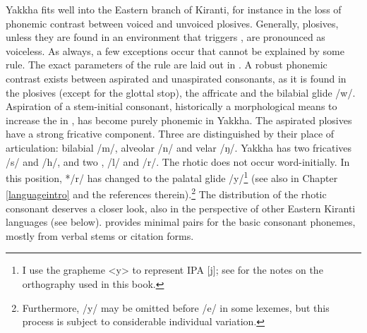 Yakkha fits well into the Eastern branch of Kiranti, for instance in the loss of phonemic  contrast between voiced and unvoiced plosives. Generally, plosives, unless they are found in an environment that triggers , are pronounced as voiceless. As always, a few exceptions occur that cannot be explained by some rule. The exact parameters of the  rule are laid out in  . A robust phonemic contrast exists between aspirated and unaspirated consonants, as it is found in the plosives (except for the glottal stop), the affricate and the bilabial glide /w/. Aspiration of a stem-initial consonant, historically a morphological means to increase the  in  \citep{Michailovsky1994Manner, Jacques2012_Internal, Hill2014_Note}, has become purely phonemic in Yakkha.  The aspirated plosives have a strong fricative component. Three  are distinguished by their place of articulation: bilabial  /m/, alveolar /n/ and velar /ŋ/. Yakkha has two fricatives /s/ and /h/, and two , /l/ and /r/. The rhotic does not occur word-initially. In this position, */r/ has changed to the palatal glide /y/\footnote{I use the grapheme <y> to represent IPA [j]; see  for the notes on the orthography used in this book.} (see also   in Chapter \ref{languageintro} and the references therein).\footnote{Furthermore, /y/ may be omitted before /e/ in some lexemes, but this process is subject to considerable individual variation.}  The distribution of the rhotic consonant deserves a closer look, also in the perspective of other Eastern Kiranti languages (see  below).  provides minimal pairs for the basic consonant phonemes, mostly from verbal stems or citation forms.


